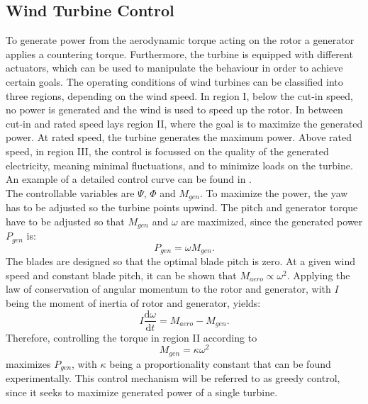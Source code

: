 \subsection{Wind Turbine Control}
\label{sec:WTC}
To generate power from the aerodynamic torque acting on the rotor a generator applies a countering torque. Furthermore, the turbine is equipped with different actuators, which can be used to manipulate the behaviour in order to achieve certain goals. The operating conditions of wind turbines can be classified into three regions, depending on the wind speed. In region I, below the cut-in speed, no power is generated and the wind is used to speed up the rotor. In between cut-in and rated speed lays region II, where the goal is to maximize the generated power. At rated speed, the turbine generates the maximum power. Above rated speed, in region III, the control is focussed on the quality of the generated electricity, meaning minimal fluctuations, and to minimize loads on the turbine. An example of a detailed control curve can be found in \cite{jonkman_definition_2009}. \cite{boersma_tutorial_2017} \\
The controllable variables are $\Psi$, $\Phi$ and $M_{gen}$. To maximize the power, the yaw has to be adjusted so the turbine points upwind. The pitch and generator torque have to be adjusted so that $M_{gen}$ and $\omega$ are maximized, since the generated power $P_{gen}$ is:
\begin{equation}
	P_{gen} = \omega M_{gen}.
\end{equation} The blades are designed so that the optimal blade pitch is zero. At a given wind speed and constant blade pitch, it can be shown that $M_{aero} \propto \omega^2$. Applying the law of conservation of angular momentum to the rotor and generator, with $I$ being the moment of inertia of rotor and generator, yields:
\begin{equation}
	I\frac{\mathrm{d}\omega}{\mathrm{d}t} = M_{aero} - M_{gen}. \label{eq:ang_mom}
\end{equation}
Therefore, controlling the torque in region II according to
\begin{equation}
	M_{gen} = \kappa \omega^2 \label{eq:control}
\end{equation} maximizes $P_{gen}$, with $\kappa$ being a proportionality constant that can be found experimentally. This control mechanism will be referred to as greedy control, since it seeks to maximize generated power of a single turbine. \cite[p.63 - 77]{hansen_aerodynamics_2008}
